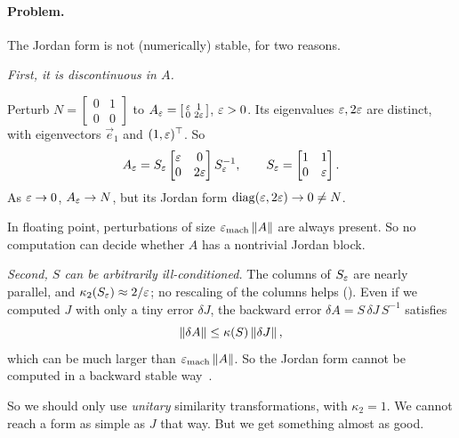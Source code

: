 \paragraph{Problem.} The Jordan form is not (numerically) stable, for two reasons.

\emph{First, it is discontinuous in $A$.}

\begin{example}
  \label{ex:jordan-unstable}
  Perturb $N = \left[\begin{smallmatrix} 0 & 1 \\ 0 & 0 \end{smallmatrix}\right]$ to $A_\varepsilon = \left[\begin{smallmatrix} \varepsilon & 1 \\ 0 & 2\varepsilon \end{smallmatrix}\right]$, $\varepsilon > 0$. Its eigenvalues $\varepsilon, 2\varepsilon$ are distinct, with eigenvectors $\vec{e}_1$ and $(1, \varepsilon)^\top$. So
  \begin{equation}
    A_\varepsilon = S_\varepsilon\begin{bmatrix} \varepsilon & 0 \\ 0 & 2\varepsilon \end{bmatrix}S_\varepsilon^{-1}, \qquad S_\varepsilon = \begin{bmatrix} 1 & 1 \\ 0 & \varepsilon \end{bmatrix}.
  \end{equation}
  As $\varepsilon \to 0$, $A_\varepsilon \to N$, but its Jordan form $\operatorname{diag}(\varepsilon, 2\varepsilon) \to 0 \ne N$.
\end{example}

In floating point, perturbations of size $\varepsilon_{\mathrm{mach}}\left\lVert A \right\rVert$ are always present. So no computation can decide whether $A$ has a nontrivial Jordan block.

\emph{Second, $S$ can be arbitrarily ill-conditioned.} The columns of $S_\varepsilon$ are nearly parallel, and $\kappa_2(S_\varepsilon) \approx 2/\varepsilon$; no rescaling of the columns helps (). Even if we computed $J$ with only a tiny error $\delta J$, the backward error $\delta A = S\,\delta J\,S^{-1}$ satisfies
\begin{equation}
  \left\lVert \delta A \right\rVert \le \kappa(S)\left\lVert \delta J \right\rVert,
\end{equation}
which can be much larger than $\varepsilon_{\mathrm{mach}}\left\lVert A \right\rVert$. So the Jordan form cannot be computed in a backward stable way~\cite[Example~4.3]{Demmel}.

So we should only use \emph{unitary} similarity transformations, with $\kappa_2 = 1$. We cannot reach a form as simple as $J$ that way. But we get something almost as good.

